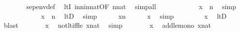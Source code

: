 \begin{isabellebody}
\ \ \ \ \ \ \isamarkupfalse%
\ sep{\isacharunderscore}{\kern0pt}env{\isacharunderscore}{\kern0pt}def\ \isamarkupfalse%
\ ltI\ in{\isacharunderscore}{\kern0pt}n{\isacharunderscore}{\kern0pt}in{\isacharunderscore}{\kern0pt}nat{\isacharbrackleft}{\kern0pt}OF\ {\isacartoucheopen}{}{\isacharhash}{\kern0pt}{\isacharplus}{\kern0pt}n{\isasymin}nat{\isacartoucheclose}{\isacharbrackright}{\kern0pt}\ \isamarkupfalse%
\ simp{\isacharunderscore}{\kern0pt}all\isanewline
\ \ \ \ \isamarkupfalse%
\ \isanewline
\ \ \ \ \isamarkupfalse%
\ {\isachardoublequoteopen}x{\isacharhash}{\kern0pt}{\isacharplus}{\kern0pt}{}\ {\isacharless}{\kern0pt}\ {}{\isacharhash}{\kern0pt}{\isacharplus}{\kern0pt}n{\isachardoublequoteclose}\ \isamarkupfalse%
\ simp\isanewline
\ \ \ \ \isamarkupfalse%
\ \isanewline
\ \ \ \ \isamarkupfalse%
\ {\isachardoublequoteopen}x{\isacharhash}{\kern0pt}{\isacharplus}{\kern0pt}{}\ {\isasymin}\ {}{\isacharhash}{\kern0pt}{\isacharplus}{\kern0pt}n{\isachardoublequoteclose}\ \isamarkupfalse%
\ ltD\ \isamarkupfalse%
\ simp\isanewline
\ \ \ \ \isamarkupfalse%
\ {\isacartoucheopen}x{\isasymin}{}{\isacharhash}{\kern0pt}{\isacharplus}{\kern0pt}n{\isacharminus}{\kern0pt}{}{\isacartoucheclose}\isanewline
\ \ \ \ \isamarkupfalse%
\ {\isachardoublequoteopen}x{\isasymnotin}{}{\isachardoublequoteclose}\ \isamarkupfalse%
\ simp\ \isanewline
\ \ \ \ \isamarkupfalse%
\ \isamarkupfalse%
\ {\isachardoublequoteopen}{\isasymnot}x{\isacharless}{\kern0pt}{}{\isachardoublequoteclose}\ \isamarkupfalse%
\ ltD\ \isamarkupfalse%
\ blast\isanewline
\ \ \ \ \isamarkupfalse%
\ \isamarkupfalse%
\ {\isachardoublequoteopen}{}{\isasymle}x{\isachardoublequoteclose}\ \isamarkupfalse%
\ not{\isacharunderscore}{\kern0pt}lt{\isacharunderscore}{\kern0pt}iff{\isacharunderscore}{\kern0pt}le\ {\isacartoucheopen}x{\isasymin}nat{\isacartoucheclose}\ \isamarkupfalse%
\ simp\isanewline
\ \ \ \ \isamarkupfalse%
\ \isamarkupfalse%
\ {\isachardoublequoteopen}{}{\isasymle}x{\isacharhash}{\kern0pt}{\isacharplus}{\kern0pt}{}{\isachardoublequoteclose}\ \isamarkupfalse%
\ add{\isacharunderscore}{\kern0pt}le{\isacharunderscore}{\kern0pt}mono\ {\isacartoucheopen}x{\isasymin}nat{\isacartoucheclose}\ \isamarkupfalse%

\end{isabellebody}
